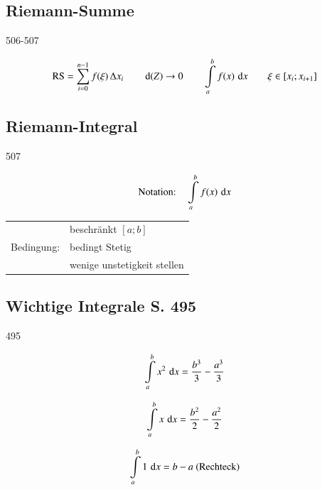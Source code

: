 \subsection{Riemann-Summe}{506-507}

\vspace{-0.2cm}
$$ \text{RS} = \sum \limits_{i=0}^{n-1} f(\xi) \, \Delta x_i  \qquad \mathop{} \! \mathrm{d} (Z) \to 0 \qquad \int \limits_{a}^{b} f(x) \,  \mathop{} \! \mathrm{d} x \qquad\xi \in [x_i ; x_{i+1}] $$	

\subsection{Riemann-Integral}{507}

\begin{minipage}{0.4\columnwidth}
    $$ \text{Notation:} \quad \int \limits_{a}^{b} f(x) \, \mathop{} \! \mathrm{d} x $$
\end{minipage}				
\hfill
\begin{minipage}{0.55\columnwidth}
    \begin{tabular}{ll}
                & beschränkt $[a;b]$\\
    Bedingung:  & bedingt Stetig\\
                & wenige unstetigkeit stellen
    \end{tabular}
\end{minipage}	


\subsection{Wichtige Integrale S. 495}{495}

\begin{minipage}[c]{0.26\columnwidth}
    $$ \int \limits_{a}^{b} x^2 \, \mathop{} \! \mathrm{d} x = \frac{b^3}{3} - \frac{a^3}{3} $$
\end{minipage}
\hfill
\begin{minipage}[c]{0.26\columnwidth}
    $$ \int \limits_{a}^{b} x \, \mathop{} \! \mathrm{d} x = \frac{b^2}{2} - \frac{a^2}{2} $$
\end{minipage}
\hfill
\begin{minipage}[c]{0.35\columnwidth}
    $$ \int \limits_{a}^{b} 1 \, \mathop{} \! \mathrm{d} x = b - a  \text{ (Rechteck)} $$ 
\end{minipage}


